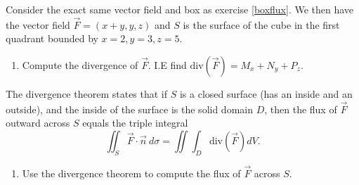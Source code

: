 
\begin{problem}
 Consider the exact same vector field and box as exercise \ref{boxflux}.  We then have the vector field $\vec F=(x+y,y,z) $  and $S$ is the surface of the cube in the first quadrant bounded by {$ x=2,y=3,z=5 $}.
\begin{enumerate}
 \item Compute the divergence of $\vec F$. I.E find $\text{div}(\vec F) = M_x+N_y+P_z$.
\end{enumerate}
The divergence theorem states that if $S$ is a closed surface (has an inside and an outside), and the inside of the surface is the solid domain $D$, then the flux of $\vec F$ outward across $S$ equals the triple integral
$$\iint_S\vec F\cdot \vec n\ d\sigma = \iint\int_D \text{div}(\vec F)dV.$$
\begin{enumerate}[resume]
	\item Use the divergence theorem to compute the flux of $\vec F$ across $S$.\newline [Hint: Just as the area is found by adding up little bits of area, which is what we mean by $A=\iint_R dA$, the volume is found by adding up little bits of volume.] 
\end{enumerate}
\end{problem}


